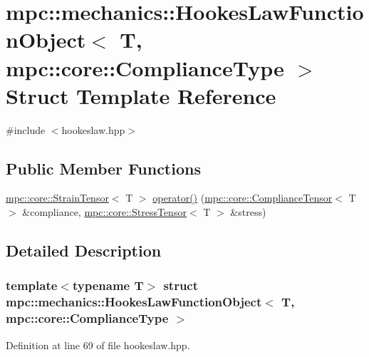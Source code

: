 \hypertarget{structmpc_1_1mechanics_1_1_hookes_law_function_object_3_01_t_00_01mpc_1_1core_1_1_compliance_type_01_4}{}\section{mpc\+:\+:mechanics\+:\+:Hookes\+Law\+Function\+Object$<$ T, mpc\+:\+:core\+:\+:Compliance\+Type $>$ Struct Template Reference}
\label{structmpc_1_1mechanics_1_1_hookes_law_function_object_3_01_t_00_01mpc_1_1core_1_1_compliance_type_01_4}


{\ttfamily \#include $<$hookeslaw.\+hpp$>$}

\subsection*{Public Member Functions}
\begin{DoxyCompactItemize}
\item 
\mbox{\hyperlink{structmpc_1_1core_1_1_strain_tensor}{mpc\+::core\+::\+Strain\+Tensor}}$<$ T $>$ \mbox{\hyperlink{structmpc_1_1mechanics_1_1_hookes_law_function_object_3_01_t_00_01mpc_1_1core_1_1_compliance_type_01_4_a55619695ae289395963ed9106f470704}{operator()}} (\mbox{\hyperlink{structmpc_1_1core_1_1_compliance_tensor}{mpc\+::core\+::\+Compliance\+Tensor}}$<$ T $>$ \&compliance, \mbox{\hyperlink{structmpc_1_1core_1_1_stress_tensor}{mpc\+::core\+::\+Stress\+Tensor}}$<$ T $>$ \&stress)
\end{DoxyCompactItemize}


\subsection{Detailed Description}
\subsubsection*{template$<$typename T$>$\newline
struct mpc\+::mechanics\+::\+Hookes\+Law\+Function\+Object$<$ T, mpc\+::core\+::\+Compliance\+Type $>$}



Definition at line 69 of file hookeslaw.\+hpp.



